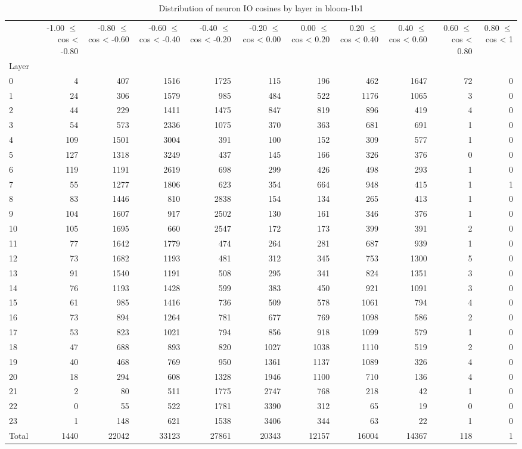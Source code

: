 \begin{table}
\caption{Distribution of neuron IO cosines by layer in bloom-1b1}
\label{tab:bloom-1b1_half_coarse}
\begin{tabular}{lrrrrrrrrrr}
 & -1.00 $\leq$ cos < -0.80 & -0.80 $\leq$ cos < -0.60 & -0.60 $\leq$ cos < -0.40 & -0.40 $\leq$ cos < -0.20 & -0.20 $\leq$ cos < 0.00 & 0.00 $\leq$ cos < 0.20 & 0.20 $\leq$ cos < 0.40 & 0.40 $\leq$ cos < 0.60 & 0.60 $\leq$ cos < 0.80 & 0.80 $\leq$ cos < 1 \\
Layer &  &  &  &  &  &  &  &  &  &  \\
0 & 4 & 407 & 1516 & 1725 & 115 & 196 & 462 & 1647 & 72 & 0 \\
1 & 24 & 306 & 1579 & 985 & 484 & 522 & 1176 & 1065 & 3 & 0 \\
2 & 44 & 229 & 1411 & 1475 & 847 & 819 & 896 & 419 & 4 & 0 \\
3 & 54 & 573 & 2336 & 1075 & 370 & 363 & 681 & 691 & 1 & 0 \\
4 & 109 & 1501 & 3004 & 391 & 100 & 152 & 309 & 577 & 1 & 0 \\
5 & 127 & 1318 & 3249 & 437 & 145 & 166 & 326 & 376 & 0 & 0 \\
6 & 119 & 1191 & 2619 & 698 & 299 & 426 & 498 & 293 & 1 & 0 \\
7 & 55 & 1277 & 1806 & 623 & 354 & 664 & 948 & 415 & 1 & 1 \\
8 & 83 & 1446 & 810 & 2838 & 154 & 134 & 265 & 413 & 1 & 0 \\
9 & 104 & 1607 & 917 & 2502 & 130 & 161 & 346 & 376 & 1 & 0 \\
10 & 105 & 1695 & 660 & 2547 & 172 & 173 & 399 & 391 & 2 & 0 \\
11 & 77 & 1642 & 1779 & 474 & 264 & 281 & 687 & 939 & 1 & 0 \\
12 & 73 & 1682 & 1193 & 481 & 312 & 345 & 753 & 1300 & 5 & 0 \\
13 & 91 & 1540 & 1191 & 508 & 295 & 341 & 824 & 1351 & 3 & 0 \\
14 & 76 & 1193 & 1428 & 599 & 383 & 450 & 921 & 1091 & 3 & 0 \\
15 & 61 & 985 & 1416 & 736 & 509 & 578 & 1061 & 794 & 4 & 0 \\
16 & 73 & 894 & 1264 & 781 & 677 & 769 & 1098 & 586 & 2 & 0 \\
17 & 53 & 823 & 1021 & 794 & 856 & 918 & 1099 & 579 & 1 & 0 \\
18 & 47 & 688 & 893 & 820 & 1027 & 1038 & 1110 & 519 & 2 & 0 \\
19 & 40 & 468 & 769 & 950 & 1361 & 1137 & 1089 & 326 & 4 & 0 \\
20 & 18 & 294 & 608 & 1328 & 1946 & 1100 & 710 & 136 & 4 & 0 \\
21 & 2 & 80 & 511 & 1775 & 2747 & 768 & 218 & 42 & 1 & 0 \\
22 & 0 & 55 & 522 & 1781 & 3390 & 312 & 65 & 19 & 0 & 0 \\
23 & 1 & 148 & 621 & 1538 & 3406 & 344 & 63 & 22 & 1 & 0 \\
Total & 1440 & 22042 & 33123 & 27861 & 20343 & 12157 & 16004 & 14367 & 118 & 1 \\
\end{tabular}
\end{table}
